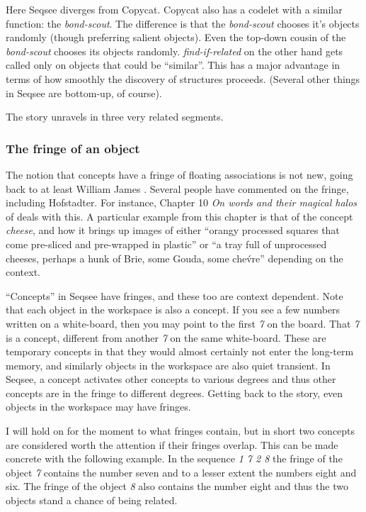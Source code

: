 Here Seqsee diverges from Copycat.  Copycat also has a codelet with a similar function: the \emph{bond-scout}.  The difference is that the \emph{bond-scout} chooses it's objects randomly (though preferring salient objects).  Even the top-down cousin of the \emph{bond-scout} chooses its objects randomly.  \emph{find-if-related} on the other hand gets called only on objects that could be ``similar''.  This has a major advantage in terms of how smoothly the discovery of structures proceeds.  (Several other things in Seqsee are bottom-up, of course).

The story unravels in three very related segments.

\subsubsection{The fringe of an object}
\label{sec:fringe}

The notion that concepts have a fringe of floating associations is not new, going back to at least William James \cite{James}.  Several people have commented on the fringe, including Hofstadter.  For instance, Chapter 10 \emph{On words and their magical halos} of  deals with this.  A particular example from this chapter is that of the concept \emph{cheese}, and how it brings up images of either ``orangy processed squares that come pre-sliced and pre-wrapped in plastic'' or ``a tray full of unprocessed cheeses, perhaps a hunk of Brie, some Gouda, some che\'vre'' depending on the context.

``Concepts'' in Seqsee have fringes, and these too are context dependent.  Note that each object in the workspace is also a concept.  If you see a few numbers written on a white-board, then you may point to the first \emph{7} on the board.  That \emph{7} is a concept, different from another \emph{7} on the same white-board.  These are temporary concepts in that they would almost certainly not enter the long-term memory, and similarly objects in the workspace are also quiet transient.  In Seqsee, a concept activates other concepts to various degrees and thus other concepts are in the fringe to different degrees. Getting back to the story, even objects in the workspace may have fringes.

I will hold on for the moment to what fringes contain, but in short two concepts are considered worth the attention if their fringes overlap.  This can be made concrete with the following example.  In the sequence \emph{1 7 2 8} the fringe of the object \emph{7} contains the number seven and to a lesser extent the numbers eight and six.  The fringe of the object \emph{8} also contains the number eight and thus the two objects stand a chance of being related.

